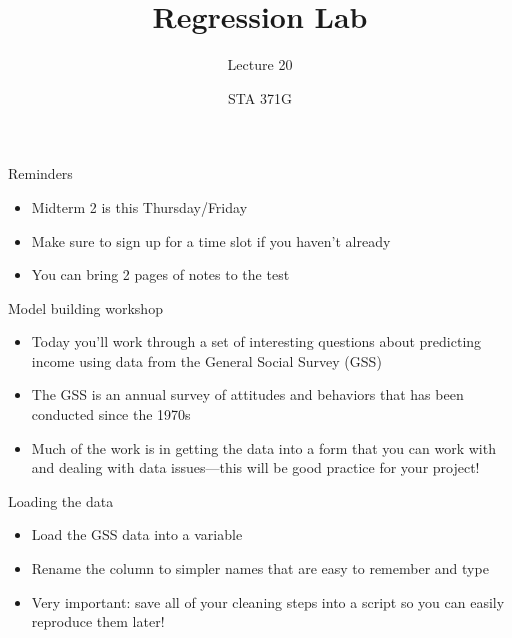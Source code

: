 \documentclass{beamer}\usepackage[]{graphicx}\usepackage[]{color}
\title{Regression Lab}
\subtitle{Lecture 20}
\author{STA 371G}
\begin{document}
  
  

  \frame{\maketitle}



  \begin{darkframes}
    \begin{frame}{Reminders}
      \begin{itemize}
        \item Midterm 2 is this Thursday/Friday
        \item Make sure to sign up for a time slot if you haven't already
        \item You can bring 2 pages of notes to the test
      \end{itemize}
    \end{frame}

    \begin{frame}{Model building workshop}
      \begin{itemize}
        \item Today you'll work through a set of interesting questions about predicting income using data from the General Social Survey (GSS)
        \item The GSS is an annual survey of attitudes and behaviors that has been conducted since the 1970s
        \item Much of the work is in getting the data into a form that you can work with and dealing with data issues---this will be good practice for your project!
      \end{itemize}
    \end{frame}

    \begin{frame}{Loading the data}
      \begin{itemize}
        \item Load the GSS data into a variable
        \item Rename the column to simpler names that are easy to remember and type
        \item \alert{Very important:} save all of your cleaning steps into a script so you can easily reproduce them later!
      \end{itemize}
    \end{frame}


\end{darkframes}
\end{document}
